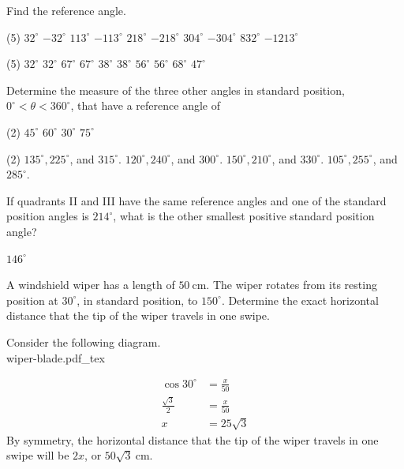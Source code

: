 \documentclass[12pt,fleqn]{book}
\newcommand{\incfig}[2][1]{%
    \def\svgwidth{#1\columnwidth}
    {#2.pdf_tex}
}
\newcommand{\prb}[1]{\begin{Exercise}\parbox[t]{\textwidth-5em}{#1}\end{Exercise}}
\newcommand{\sol}[1]{\begin{Answer}\parbox[t]{\textwidth-5em}{#1}\end{Answer}}
\begin{document}
\prb{Find the reference angle.
	\begin{tasks}(5)
		\task $32^{\circ}$ 		\vspace{1in}
		\task $-32^{\circ}$ 	\vspace{1in}
		\task $113^{\circ}$ 	\vspace{1in}
		\task $-113^{\circ}$ 	\vspace{1in}
		\task $218^{\circ}$ 	\vspace{1in}
		\task $-218^{\circ}$ 	\vspace{1in}
		\task $304^{\circ}$ 	\vspace{1in}
		\task $-304^{\circ}$ 	\vspace{1in}
		\task $832^{\circ}$ 	\vspace{1in}
		\task $-1213^{\circ}$ 	\vspace{1in}
	\end{tasks}
}
\sol{
	\begin{tasks}(5)
		\task $32^{\circ}$
		\task $32^{\circ}$
		\task $67^{\circ}$
		\task $67^{\circ}$
		\task $38^{\circ}$
		\task $38^{\circ}$
		\task $56^{\circ}$
		\task $56^{\circ}$
		\task $68^{\circ}$
		\task $47^{\circ}$
	\end{tasks}
}
\prb{
Determine the measure of the three other angles in standard position, $0^{\circ}<\theta<360^{\circ}$, that have a reference angle of
\begin{tasks}(2)
	\task $45^{\circ}$
	\task $60^{\circ}$
	\task $30^{\circ}$
	\task $75^{\circ}$
\end{tasks}
}
\sol{
\begin{tasks}(2)
	\task $135^{\circ}, 225^{\circ}$, and $315^{\circ}$.
	\task $120^{\circ}, 240^{\circ}$, and $300^{\circ}$.
	\task $150^{\circ}, 210^{\circ}$, and $330^{\circ}$.
	\task $105^{\circ}, 255^{\circ}$, and $285^{\circ}$.
\end{tasks}
}
\prb{
	If quadrants II and III have the same reference angles and one of the standard position angles is $214^{\circ}$, what is the other smallest positive standard position angle?
	\vspace{3em}}
\sol{$146^\circ$}
\prb{
	A windshield wiper has a length of $50 \mathrm{~cm}$. The wiper rotates from its resting position at $30^{\circ}$, in standard position, to $150^{\circ}$. Determine the exact horizontal distance that the tip of the wiper travels in one swipe.
	\vspace{15em}
	}
\sol{
	Consider the following diagram.\\
	\incfig[0.4]{wiper-blade}
	\begin{align*}
		\cos 30^{\circ}    & =\frac{x}{50} \\
		\frac{\sqrt{3}}{2} & =\frac{x}{50} \\
		x                  & =25 \sqrt{3}
	\end{align*}
	By symmetry, the horizontal distance that the tip of the wiper travels in one swipe will be $2 x$, or $50 \sqrt{3} \mathrm{~cm}$.
}
\end{document}
